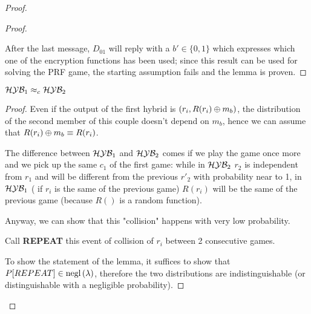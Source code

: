 \begin{proof}
\begin{proof}
\begin{figure}[h!]
\end{figure}

After the last message, $D_{01}$ will reply with a $b' \in \{0,1\}$ which
expresses which one of the encryption functions has been used; since this result
can be used for solving the PRF game, the starting assumption fails and the
lemma is proven.

\end{proof}

\begin{lemma}

    $\mathcal{H}\mathcal{Y}\mathcal{B}_{1} \approx_{c} \mathcal{H}\mathcal{Y}\mathcal{B}_{2}$
    
\end{lemma}
\begin{proof}
Even if the output of the first  hybrid is $(r_{i}, R(r_{i}) \oplus m_{b})$, the distribution of the second member of this couple doesn't depend on $m_{b}$, hence we can assume that $R(r_{i}) \oplus m_{b} \equiv R(r_{i})$.

The difference between $\mathcal{H}\mathcal{Y}\mathcal{B}_{1}$ and $\mathcal{H}\mathcal{Y}\mathcal{B}_{2}$ comes if we play the game once more and we pick up the same $c_{1}$ of the first game: while in $\mathcal{H}\mathcal{Y}\mathcal{B}_{2}$ $r_{2}$ is independent from $r_{1}$ and will be different from the previous $r'_{2}$  with probability near to 1, in $\mathcal{H}\mathcal{Y}\mathcal{B}_{1}$ ( if $r_{i}$ is the same of the previous game) $R(r_{i})$ will be the same of the previous game (because $R()$ is a random function).

Anyway, we can show that this "collision" happens with very low probability.

Call \textbf{REPEAT}  this event of collision of $r_{i}$ between 2 consecutive games.

To show the statement of the lemma, it suffices to show that $P[REPEAT] \in \mathrm{negl}\left({\lambda}\right) $, therefore the two distributions are indistinguishable (or distinguishable with a negligible probability).


\end{proof}
\end{proof}
